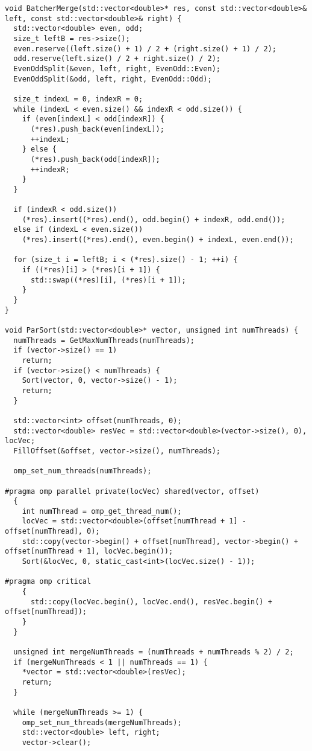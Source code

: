 \documentclass{report}
\begin{document}
\begin{lstlisting}
void BatcherMerge(std::vector<double>* res, const std::vector<double>& left, const std::vector<double>& right) {
  std::vector<double> even, odd;
  size_t leftB = res->size();
  even.reserve((left.size() + 1) / 2 + (right.size() + 1) / 2);
  odd.reserve(left.size() / 2 + right.size() / 2);
  EvenOddSplit(&even, left, right, EvenOdd::Even);
  EvenOddSplit(&odd, left, right, EvenOdd::Odd);

  size_t indexL = 0, indexR = 0;
  while (indexL < even.size() && indexR < odd.size()) {
    if (even[indexL] < odd[indexR]) {
      (*res).push_back(even[indexL]);
      ++indexL;
    } else {
      (*res).push_back(odd[indexR]);
      ++indexR;
    }
  }

  if (indexR < odd.size())
    (*res).insert((*res).end(), odd.begin() + indexR, odd.end());
  else if (indexL < even.size())
    (*res).insert((*res).end(), even.begin() + indexL, even.end());

  for (size_t i = leftB; i < (*res).size() - 1; ++i) {
    if ((*res)[i] > (*res)[i + 1]) {
      std::swap((*res)[i], (*res)[i + 1]);
    }
  }
}

void ParSort(std::vector<double>* vector, unsigned int numThreads) {
  numThreads = GetMaxNumThreads(numThreads);
  if (vector->size() == 1)
    return;
  if (vector->size() < numThreads) {
    Sort(vector, 0, vector->size() - 1);
    return;
  }

  std::vector<int> offset(numThreads, 0);
  std::vector<double> resVec = std::vector<double>(vector->size(), 0), locVec;
  FillOffset(&offset, vector->size(), numThreads);

  omp_set_num_threads(numThreads);

#pragma omp parallel private(locVec) shared(vector, offset)
  {
    int numThread = omp_get_thread_num();
    locVec = std::vector<double>(offset[numThread + 1] - offset[numThread], 0);
    std::copy(vector->begin() + offset[numThread], vector->begin() + offset[numThread + 1], locVec.begin());
    Sort(&locVec, 0, static_cast<int>(locVec.size() - 1));

#pragma omp critical
    {
      std::copy(locVec.begin(), locVec.end(), resVec.begin() + offset[numThread]);
    }
  }

  unsigned int mergeNumThreads = (numThreads + numThreads % 2) / 2;
  if (mergeNumThreads < 1 || numThreads == 1) {
    *vector = std::vector<double>(resVec);
    return;
  }

  while (mergeNumThreads >= 1) {
    omp_set_num_threads(mergeNumThreads);
    std::vector<double> left, right;
    vector->clear();


\end{lstlisting}
\end{document}
